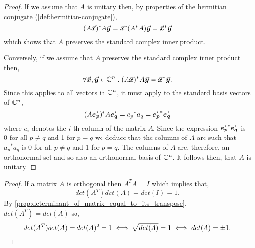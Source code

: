 \documentclass[../MathsNotesBase.tex]{subfiles}
\begin{document}
{		\bigskip
		\begin{proof}
			If we assume that $A$ is unitary then, by properties of the hermitian conjugate (\ref{def:hermitian-conjugate}),
			\[ (A\vec{\bm{x}})^* A\vec{\bm{y}} = \vec{\bm{x}}^* (A^* A) \vec{\bm{y}} = \vec{\bm{x}}^* \vec{\bm{y}} \]
			which shows that $A$ preserves the standard complex inner product.\\
			
			
			Conversely, if we assume that $A$ preserves the standard complex inner product then,
			\[ \forall \vec{\bm{x}},\vec{\bm{y}} \in \mathbb{C}^{n} \;.\; (A \vec{\bm{x}})^* A \vec{\bm{y}} = \vec{\bm{x}}^* \vec{\bm{y}}. \]
			Since this applies to all vectors in $\mathbb{C}^{n}$, it must apply to the standard basis vectors of $\mathbb{C}^{n}$,
			\[ (A \vec{\bm{e_p}})^* A \vec{\bm{e_q}} = {a_p}^* a_q = \vec{\bm{e_p}}^* \vec{\bm{e_q}} \]
			where $a_i$ denotes the $i$-th column of the matrix $A$. Since the expression ${ \vec{\bm{e_p}}^* \vec{\bm{e_q}} }$ is 0 for all ${ p \neq q }$ and 1 for ${ p = q }$ we deduce that the columns of $A$ are such that ${ {a_p}^* a_q }$ is 0 for all ${ p \neq q }$ and 1 for ${ p = q }$. The columns of $A$ are, therefore, an orthonormal set and so also an orthonormal basis of $\mathbb{C}^{n}$. It follows then, that $A$ is unitary.
		\end{proof}
		
		
		\bigskip
		\begin{proof}
			If a matrix $A$ is orthogonal then ${ A^TA = I }$ which implies that,
			\[ det(A^T)det(A) = det(I) = 1. \]
			By \autoref{prop:determinant_of_matrix_equal_to_its_transpose}, ${ det(A^T) = det(A) }$ so,
			\[ det(A^T)det(A) = det(A)^2 = 1 \iff \sqrt{det(A)} = 1 \iff det(A) = \pm 1.  \qedhere \]
		\end{proof}
		
}
\end{document}
